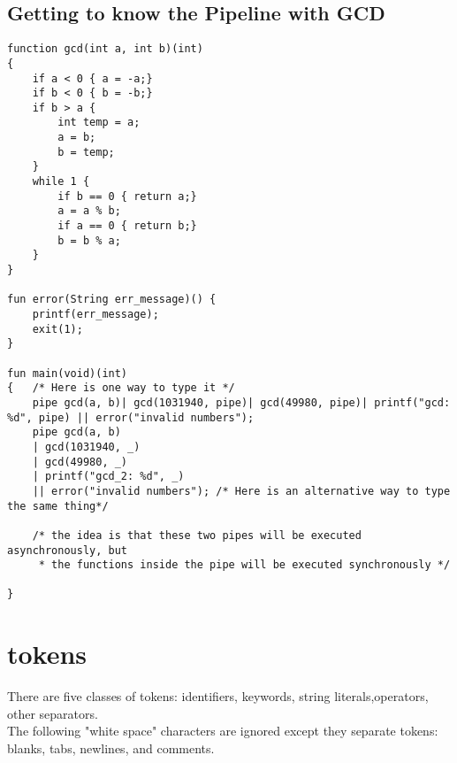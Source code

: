 \documentclass[./LRM_main.tex]{subfiles}
\begin{document}
\subsection{Getting to know the Pipeline with GCD}
\begin{lstlisting}
function gcd(int a, int b)(int)
{
	if a < 0 { a = -a;}
	if b < 0 { b = -b;}
	if b > a {
		int temp = a;
		a = b;
		b = temp;
	}
	while 1 {
		if b == 0 { return a;}
		a = a % b;
		if a == 0 { return b;}
		b = b % a;
	}
}

fun error(String err_message)() {
	printf(err_message);
	exit(1);
}

fun main(void)(int)
{	/* Here is one way to type it */
	pipe gcd(a, b)| gcd(1031940, pipe)| gcd(49980, pipe)| printf("gcd: %d", pipe) || error("invalid numbers");	
	pipe gcd(a, b)
	| gcd(1031940, _)
	| gcd(49980, _)
	| printf("gcd_2: %d", _)
	|| error("invalid numbers"); /* Here is an alternative way to type the same thing*/

	/* the idea is that these two pipes will be executed asynchronously, but
	 * the functions inside the pipe will be executed synchronously */

}

\end{lstlisting}
\section{tokens}
There are five classes of tokens:
identifiers, keywords, string literals,operators, other separators.\\
The following "white space" characters are ignored except they separate tokens: blanks, tabs, newlines, and comments.\\
\end{document}
